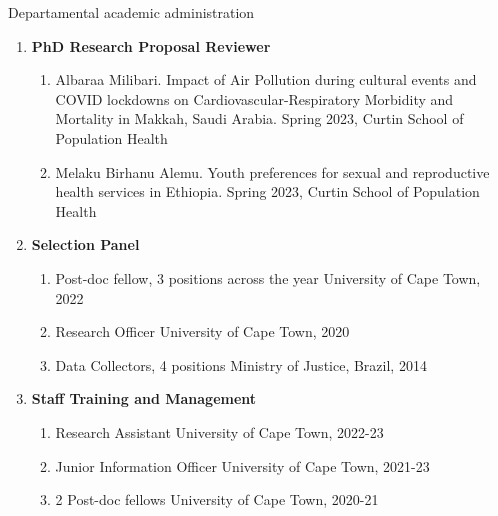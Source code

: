 \begin{rSection}{Departamental academic administration}

\begin{enumerate}[label=\Roman*]

\item {\textbf{PhD Research Proposal Reviewer}}
\par

\begin{enumerate}[label=(\roman*)]

\item {Albaraa Milibari. Impact of Air Pollution during cultural events and COVID lockdowns  on Cardiovascular-Respiratory Morbidity and Mortality in Makkah, Saudi Arabia. Spring 2023, Curtin School of Population Health}\par

\item {Melaku Birhanu Alemu. Youth preferences for sexual and reproductive health services in Ethiopia. Spring 2023, Curtin School of Population Health}
\end{enumerate}

\item {\textbf {Selection Panel}}
\par

\begin{enumerate}[label=(\roman*)]
\item{Post-doc fellow, 3 positions across the year} \hfill{University of Cape Town, 2022}

\item{Research Officer} \hfill{University of Cape Town, 2020}

\item{Data Collectors, 4 positions} \hfill{Ministry of Justice, Brazil, 2014}
\end{enumerate}

\item{\textbf {Staff Training and Management}}
\par

\begin{enumerate}[label=(\roman*)]
\item {Research Assistant} \hfill{University of Cape Town, 2022-23}

\item {Junior Information Officer} \hfill{University of Cape Town, 2021-23}

\item {2 Post-doc fellows} \hfill{University of Cape Town, 2020-21}


\end{enumerate}
\end{enumerate}
\end{rSection}
